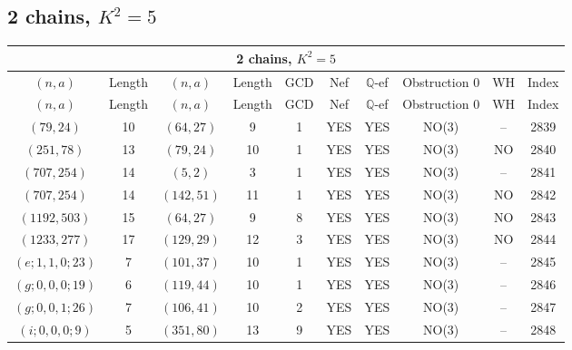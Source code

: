 \subsection{2 chains, $K^2 = 5$}
\begin{longtable}{|c|c|c|c|c|c|c|c|c|c|}
\hline
\multicolumn{10}{|c|}{2 chains, $K^2 = 5$}\\
\hline
$(n,a)$ & Length & $(n,a)$ & Length & GCD & Nef & $\mathbb Q$-ef & Obstruction 0 & WH & Index\\
\hline
\endfirsthead

\hline
$(n,a)$ & Length & $(n,a)$ & Length & GCD & Nef & $\mathbb Q$-ef & Obstruction 0 & WH & Index\\
\hline
\endhead
\hline
\endfoot

$(79, 24)$ & 10 & $(64, 27)$ & 9 & 1 & YES & YES & NO(3) & -- & 2839\\
$(251, 78)$ & 13 & $(79, 24)$ & 10 & 1 & YES & YES & NO(3) & NO & 2840\\
$(707, 254)$ & 14 & $(5, 2)$ & 3 & 1 & YES & YES & NO(3) & -- & 2841\\
$(707, 254)$ & 14 & $(142, 51)$ & 11 & 1 & YES & YES & NO(3) & NO & 2842\\
$(1192, 503)$ & 15 & $(64, 27)$ & 9 & 8 & YES & YES & NO(3) & NO & 2843\\
$(1233, 277)$ & 17 & $(129, 29)$ & 12 & 3 & YES & YES & NO(3) & NO & 2844\\
$(e; 1, 1, 0; 23)$ & 7 & $(101, 37)$ & 10 & 1 & YES & YES & NO(3) & -- & 2845\\
$(g; 0, 0, 0; 19)$ & 6 & $(119, 44)$ & 10 & 1 & YES & YES & NO(3) & -- & 2846\\
$(g; 0, 0, 1; 26)$ & 7 & $(106, 41)$ & 10 & 2 & YES & YES & NO(3) & -- & 2847\\
$(i; 0, 0, 0; 9)$ & 5 & $(351, 80)$ & 13 & 9 & YES & YES & NO(3) & -- & 2848
\end{longtable}
